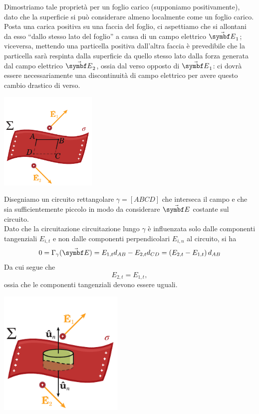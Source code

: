 \begin{demonstration}
	Dimostriamo tale proprietà per un foglio carico (supponiamo positivamente), dato che la superficie si può considerare almeno localmente come un foglio 
	carico.\\
	Posta una carica positiva su una faccia del foglio, ci aspettiamo che si allontani da esso ``dallo stesso lato del foglio'' a causa di un campo elettrico $\vba{E}_1$; viceversa, mettendo una particella positiva dall'altra faccia è prevedibile che la particella sarà respinta dalla superficie da quello stesso lato dalla forza generata dal campo elettrico $\vba{E}_2$, ossia dal verso opposto di $\vba{E}_1$: ci dovrà essere necessariamente una discontinuità di campo elettrico per avere questo cambio drastico di verso.
	\begin{center}
		\includegraphics[width=0.35\textwidth]{images/chp3/chp3discontinuita1.pdf}
	\end{center}
	Disegniamo un circuito rettangolare $\gamma=[ABCD]$ che interseca il campo e che sia sufficientemente piccolo in modo da considerare $\vba{E}$ costante sul circuito.\\
	Dato che la circuitazione circuitazione lungo $\gamma$ è influenzata solo dalle componenti tangenziali $E_{i,t}$ e non dalle componenti perpendicolari $E_{i,n}$ al circuito, si ha
	\begin{equation*}
		0=\Gamma_{\gamma}(\vba{E})=E_{1,t}d_{AB}-E_{2,t}d_{CD}=\left(E_{2,t}-E_{1,t}\right)d_{AB}
	\end{equation*}
Da cui segue che
\begin{equation*}
	E_{2,t}=E_{1,t},
\end{equation*}
ossia che le componenti tangenziali devono essere uguali.
\begin{center}
	\includegraphics[width=0.45\textwidth]{images/chp3/chp3discontinuita2.pdf}

\end{center}
\end{demonstration}
